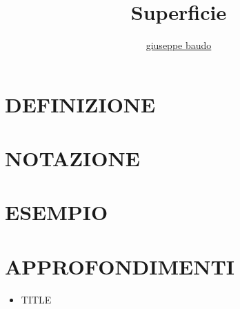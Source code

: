 \documentclass[a4paper,10pt]{article}
\title{Superficie}
\author{\href{http://www.baudo.hol.es}{giuseppe baudo}}
\begin{document}
\maketitle

\section{DEFINIZIONE}

\section{NOTAZIONE}

\section{ESEMPIO}

\section{APPROFONDIMENTI}
\begin{itemize}
 \item TITLE
\end{itemize}
\end{document}
